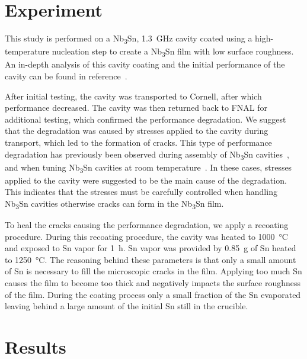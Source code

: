 \section{Experiment}
\label{sec:Experiment}

This study is performed on a Nb\textsubscript{3}Sn, \qty{1.3}{\giga\hertz} cavity coated using a high-temperature nucleation step to create a Nb\textsubscript{3}Sn film with low surface roughness. An in-depth analysis of this cavity coating and the initial performance of the cavity can be found in reference~\cite{posen2021advances}. 

After initial testing, the cavity was transported to Cornell, after which performance decreased. The cavity was then returned back to FNAL for additional testing, which confirmed the performance degradation. We suggest that the degradation was caused by stresses applied to the cavity during transport, which led to the formation of cracks. This type of performance degradation has previously been observed during assembly of Nb\textsubscript{3}Sn cavities~\cite{eremeev2023preservation}, and when tuning Nb\textsubscript{3}Sn cavities at room temperature~\cite{eremeev:srf2019-mop015}. In these cases, stresses applied to the cavity were suggested to be the main cause of the degradation. This indicates that the stresses must be carefully controlled when handling Nb\textsubscript{3}Sn cavities otherwise cracks can form in the Nb\textsubscript{3}Sn film.

To heal the cracks causing the performance degradation, we apply a recoating procedure. During this recoating procedure, the cavity was heated to \qty{1000}{\degreeCelsius} and exposed to Sn vapor for \qty{1}{\hour}. Sn vapor was provided by \qty{0.85}{\gram} of Sn heated to \qty{1250}{\degreeCelsius}. The reasoning behind these parameters is that only a small amount of Sn is necessary to fill the microscopic cracks in the film. Applying too much Sn causes the film to become too thick and negatively impacts the surface roughness of the film. During the coating process only a small fraction of the Sn evaporated leaving behind a large amount of the initial Sn still in the crucible. 

\section{Results}
\label{sec:Results}

